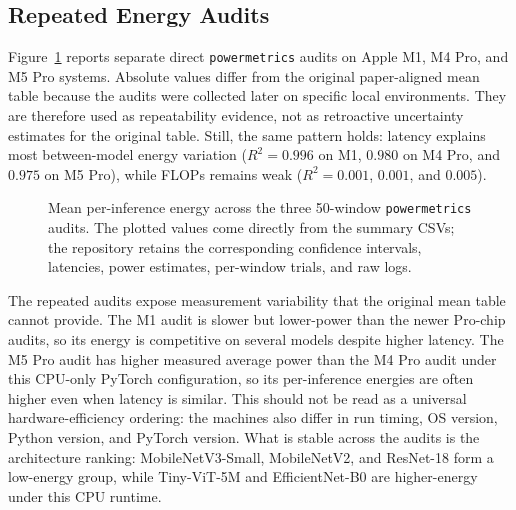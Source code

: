 \documentclass[conference]{IEEEtran}
\begin{document}
\subsection{Repeated Energy Audits}

Figure~\ref{fig:audit-energy} reports
separate direct \texttt{powermetrics} audits on
Apple M1, M4 Pro, and M5 Pro systems. Absolute values differ from the original
paper-aligned mean table because the audits were collected later on specific
local environments. They are therefore used as repeatability evidence, not as
retroactive uncertainty estimates for the original table. Still, the same
pattern holds: latency explains most between-model energy variation
($R^2=0.996$ on M1, $0.980$ on M4 Pro, and $0.975$ on M5 Pro), while FLOPs
remains weak ($R^2=0.001$, $0.001$, and $0.005$).
\begin{figure}[t]
\centering
{}
\caption{Mean per-inference energy across the three 50-window
\texttt{powermetrics} audits. The plotted values come directly from the
summary CSVs; the repository retains the corresponding confidence intervals,
latencies, power estimates, per-window trials, and raw logs.}
\label{fig:audit-energy}
\end{figure}

The repeated audits expose measurement variability that the original mean
table cannot provide. The M1 audit is slower but lower-power than the newer
Pro-chip audits, so its energy is competitive on several models despite higher
latency. The M5 Pro audit has higher measured average power than the M4 Pro
audit under this CPU-only PyTorch configuration, so its per-inference energies
are often higher even when latency is similar. This should not be read as a
universal hardware-efficiency ordering: the machines also differ in run
timing, OS version, Python version, and PyTorch version. What is stable across
the audits is the architecture ranking:
MobileNetV3-Small, MobileNetV2, and ResNet-18 form a low-energy group, while
Tiny-ViT-5M and EfficientNet-B0 are higher-energy under this CPU runtime.
\end{document}
